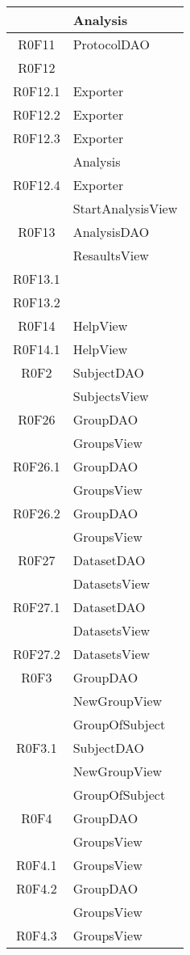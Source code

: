 \begin{center}
\begin{longtable}{|c|l|}
 & Analysis \\ 
\hline
R0F11 & ProtocolDAO \\ 
\hline
R0F12 & \\ 
\hline
R0F12.1 & Exporter \\ 
\hline
R0F12.2 & Exporter \\ 
\hline
R0F12.3 & Exporter \\ 
 & Analysis \\ 
\hline
R0F12.4 & Exporter \\ 
 & StartAnalysisView \\ 
\hline
R0F13 & AnalysisDAO \\ 
 & ResaultsView \\ 
\hline
R0F13.1 & \\ 
\hline
R0F13.2 & \\ 
\hline
R0F14 & HelpView \\ 
\hline
R0F14.1 & HelpView \\ 
\hline
R0F2 & SubjectDAO \\ 
 & SubjectsView \\ 
\hline
R0F26 & GroupDAO \\ 
 & GroupsView \\ 
\hline
R0F26.1 & GroupDAO \\ 
 & GroupsView \\ 
\hline
R0F26.2 & GroupDAO \\ 
 & GroupsView \\ 
\hline
R0F27 & DatasetDAO \\ 
 & DatasetsView \\ 
\hline
R0F27.1 & DatasetDAO \\ 
 & DatasetsView \\ 
\hline
R0F27.2 & DatasetsView \\ 
\hline
R0F3 & GroupDAO \\ 
 & NewGroupView \\ 
 & GroupOfSubject \\ 
\hline
R0F3.1 & SubjectDAO \\ 
 & NewGroupView \\ 
 & GroupOfSubject \\ 
\hline
R0F4 & GroupDAO \\ 
 & GroupsView \\ 
\hline
R0F4.1 & GroupsView \\ 
\hline
R0F4.2 & GroupDAO \\ 
 & GroupsView \\ 
\hline
R0F4.3 & GroupsView \\ 

\end{longtable}
\end{center}
